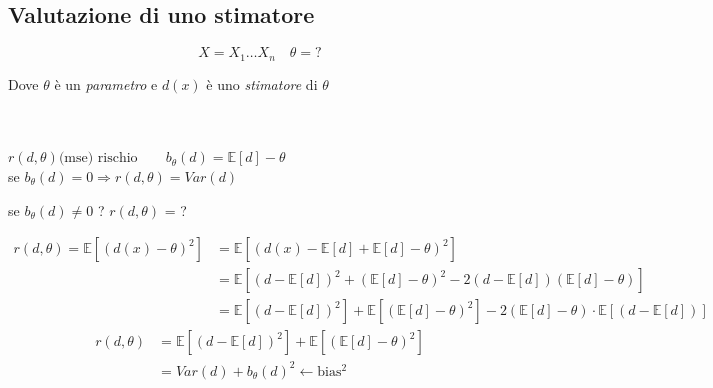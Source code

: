 \documentclass[]{article}
\newcommand{\ev}{\mathbb{E}[X]}
\renewcommand{\ev}[1]{\mathbb{E}[#1]}
\begin{document}
    \subsection{Valutazione di uno stimatore}
    \[ X = X_1 \ldots X_n \quad \theta = ? \]
    \centerline{Dove $\theta$ è un \textit{parametro} e $d(x)$ è uno \textit{stimatore} di $\theta$} \\ \\
    $r(d, \theta) \text{(mse) rischio} \quad \quad b_\theta(d) = \ev{d} - \theta$ \\
    se $b_\theta(d) = 0 \Rightarrow r(d, \theta) = Var(d)$ \\
    \centerline{se $b_\theta(d) \not = 0$ ? $r(d, \theta)$ = ?}
    \begin{equation*}
        \begin{split}
            r(d, \theta) = \ev{(d(x) - \theta)^2} &= \ev{(d(x) - \ev{d} + \ev{d} - \theta)^2} \\
            &= \ev{(d - \ev{d})^2 + (\ev{d} - \theta)^2 - 2(d - \ev{d}) (\ev{d} - \theta)} \\
            &= \ev{(d - \ev{d})^2} + \ev{(\ev{d} - \theta)^2} - 2(\ev{d} - \theta) \cdot \ev{(d- \ev{d})}
        \end{split}
    \end{equation*}
    \begin{equation*}
        \begin{split}
           r(d, \theta) &= \ev{(d - \ev{d})^2} + \ev{(\ev{d} - \theta)^2} \\
           &= Var(d) + b_\theta(d)^2 \leftarrow \text{bias$^2$}
        \end{split}
    \end{equation*}
\end{document}
